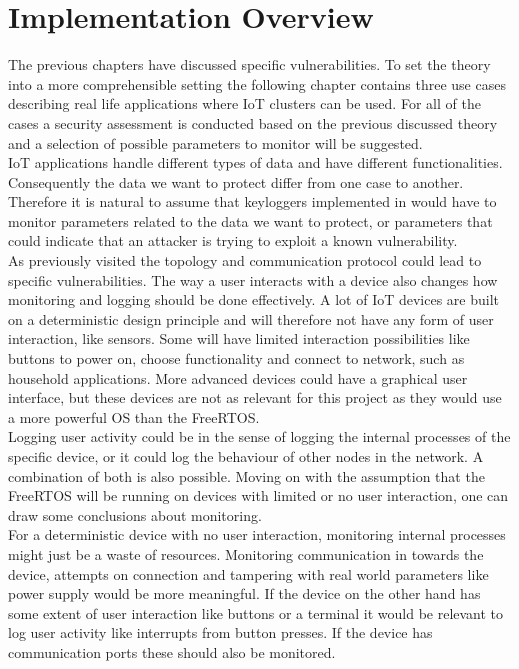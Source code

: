 \chapter{Implementation Overview}

\label{chap:real_world_app}

The previous chapters have discussed specific vulnerabilities. To set the theory into a more comprehensible setting the following chapter contains three use cases describing real life applications where IoT clusters can be used. For all of the cases a security assessment is conducted based on the previous discussed theory and a selection of possible parameters to monitor will be suggested.\\ 

IoT applications handle different types of data and have different functionalities. Consequently the data we want to protect differ from one case to another. Therefore it is natural to assume that keyloggers implemented in would have to monitor parameters related to the data we want to protect, or parameters that could indicate that an attacker is trying to exploit a known vulnerability. \\

As previously visited the topology and communication protocol could lead to specific vulnerabilities. The way a user interacts with a device also changes how monitoring and logging should be done effectively. A lot of IoT devices are built on a deterministic design principle and will therefore not have any form of user interaction, like sensors. Some will have limited interaction possibilities like buttons to power on, choose functionality and connect to network, such as household applications. More advanced devices could have a graphical user interface, but these devices are not as relevant for this project as they would use a more powerful OS than the FreeRTOS.\\

Logging user activity could be in the sense of logging the internal processes of the specific device, or it could log the behaviour of other nodes in the network. A combination of both is also possible. Moving on with the assumption that the FreeRTOS will be running on devices with limited or no user interaction, one can draw some conclusions about monitoring. \\

For a deterministic device with no user interaction, monitoring internal processes might just be a waste of resources. Monitoring communication in towards the device, attempts on connection and tampering with real world parameters like power supply would be more meaningful. If the device on the other hand has some extent of user interaction like buttons or a terminal it would be relevant to log user activity like interrupts from button presses. If the device has communication ports these should also be monitored.\\

